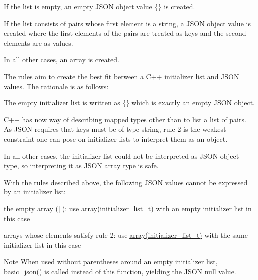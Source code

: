 \begin{DoxyEnumerate}
\item If the list is empty, an empty J\+S\+ON object value {\ttfamily \{\}} is created.
\item If the list consists of pairs whose first element is a string, a J\+S\+ON object value is created where the first elements of the pairs are treated as keys and the second elements are as values.
\item In all other cases, an array is created.
\end{DoxyEnumerate}

The rules aim to create the best fit between a C++ initializer list and J\+S\+ON values. The rationale is as follows\+:


\begin{DoxyEnumerate}
\item The empty initializer list is written as {\ttfamily \{\}} which is exactly an empty J\+S\+ON object.
\item C++ has now way of describing mapped types other than to list a list of pairs. As J\+S\+ON requires that keys must be of type string, rule 2 is the weakest constraint one can pose on initializer lists to interpret them as an object.
\item In all other cases, the initializer list could not be interpreted as J\+S\+ON object type, so interpreting it as J\+S\+ON array type is safe.
\end{DoxyEnumerate}

With the rules described above, the following J\+S\+ON values cannot be expressed by an initializer list\+:


\begin{DoxyItemize}
\item the empty array ({\ttfamily \mbox{[}\mbox{]}})\+: use \hyperlink{classnlohmann_1_1basic__json_aa80485befaffcadaa39965494e0b4d2e}{array(initializer\+\_\+list\+\_\+t)} with an empty initializer list in this case
\item arrays whose elements satisfy rule 2\+: use \hyperlink{classnlohmann_1_1basic__json_aa80485befaffcadaa39965494e0b4d2e}{array(initializer\+\_\+list\+\_\+t)} with the same initializer list in this case
\end{DoxyItemize}

\begin{DoxyNote}{Note}
When used without parentheses around an empty initializer list, \hyperlink{classnlohmann_1_1basic__json_aed115142bd0c6c66c864700e0467df55}{basic\+\_\+json()} is called instead of this function, yielding the J\+S\+ON null value.
\end{DoxyNote}

